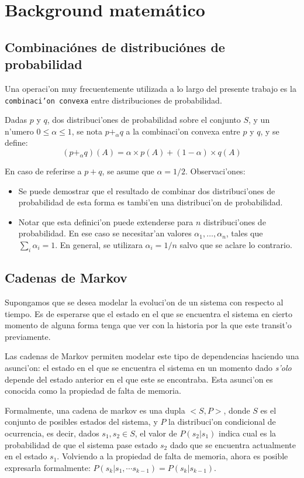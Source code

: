 
\section{Background matem\'atico}
\subsection{Combinaci\'ones de distribuci\'ones de probabilidad}
Una operaci'on muy frecuentemente utilizada a lo largo del presente trabajo es la \texttt{combinaci'on convexa} entre distribuciones
de probabilidad.

Dadas $p$ y $q$, dos distribuci'ones de probabilidad sobre el conjunto $S$, y un n'umero $0 \leq \alpha \leq 1$, 
se nota $p +_\alpha q$ a la combinaci'on convexa entre $p$ y $q$, y se define:
$$(p +_\alpha q)(A) = \alpha \times p(A) + (1-\alpha) \times q(A)$$ 

En caso de referirse a $p+q$, se asume que $\alpha = 1/2$. 
\newline \newline
Observaci'ones:
\begin{itemize}
 \item Se puede demostrar que el resultado de combinar dos distribuci'ones de probabilidad de esta forma es tambi'en una distribuci'on 
de probabilidad.

 \item Notar que esta definici'on puede extenderse para $n$ distribuci'ones de probabilidad. En ese caso se necesitar'an valores 
$\alpha_1, \dots, \alpha_n$, tales que $\sum_i \alpha_i = 1$. En general, se utilizara $\alpha_i = 1/n$ salvo que se aclare lo contrario.
\end{itemize}


\subsection{Cadenas de Markov}
Supongamos que se desea modelar la evoluci'on de un sistema con respecto al tiempo. Es de esperarse que 
el estado en el que se encuentra el sistema en cierto momento de alguna forma tenga que ver con la historia por la que este transit'o
previamente. 

Las cadenas de Markov permiten modelar este tipo de dependencias haciendo una asunci'on: el estado en el que se encuentra el sistema
en un momento dado \emph{s'olo} depende del estado anterior en el que este se encontraba. Esta asunci'on es conocida como la propiedad
de falta de memoria.

Formalmente, una cadena de markov es una dupla $<S,P>$, donde $S$ es el conjunto de posibles estados del sistema, y $P$ la 
distribuci'on condicional de ocurrencia, es decir, dados $s_1, s_2 \in S$, el valor de $P(s_2 | s_1)$ indica cual es la probabilidad
de que el sistema pase estado $s_2$ dado que se encuentra actualmente en el estado $s_1$.  Volviendo a la propiedad de falta de memoria, 
ahora es posible expresarla formalmente: $P(s_k | s_1, \cdots s_{k-1}) = P(s_k | s_{k-1})$.

